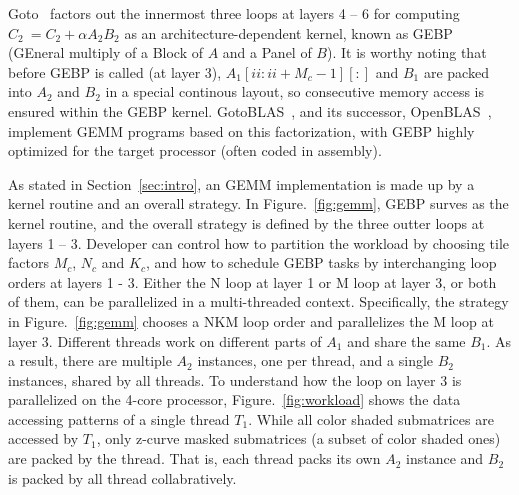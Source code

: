 Goto~\cite{gotogemm} factors out the innermost three loops at layers 4 -- 6 for
computing $C_2\ = C_2 + \alpha A_2 B_2$ as an architecture-dependent kernel,
known as  GEBP (GEneral multiply of a Block of $A$ and a Panel of $B$).
It is worthy noting that before GEBP is called (at layer 3),
$A_1[ii:ii+M_c-1][:]$ and $B_1$ are packed into $A_2$ and $B_2$
in a special continous layout,
so consecutive memory access is ensured within the GEBP kernel.
GotoBLAS~\cite{gotoblas}, and its successor, OpenBLAS~\cite{openblas},
implement GEMM programs based on this factorization,
with GEBP highly optimized for the target processor (often coded in assembly).

As stated in Section~\ref{sec:intro}, an GEMM implementation
is made up by a kernel routine and an overall strategy.
In Figure.~\ref{fig:gemm}, GEBP surves as the kernel routine,
and the overall strategy is defined by the three outter loops at layers 1 -- 3.
Developer can control how to partition the workload by choosing
tile factors $M_c$, $N_c$ and $K_c$,
and how to schedule GEBP tasks by interchanging loop orders at layers 1 - 3.
Either the N loop at layer 1 or M loop at layer 3, or both of them,
can be parallelized in a multi-threaded context.
Specifically, the strategy in Figure.~\ref{fig:gemm} chooses a NKM loop order and
parallelizes the M loop at layer 3.
Different threads work on different parts of $A_1$
and share the same $B_1$.
As a result, there are multiple $A_2$ instances, one per thread,
and a single $B_2$ instances, shared by all threads.
To understand how the loop on layer 3 is parallelized on the 4-core processor, 
Figure.~\ref{fig:workload} shows the data accessing patterns of a single thread $T_1$.
While all color shaded submatrices are accessed by $T_1$,
only z-curve masked submatrices (a subset of color shaded ones)
are packed by the thread.
That is, each thread packs its own $A_2$ instance and 
$B_2$ is packed by all thread collabratively.

